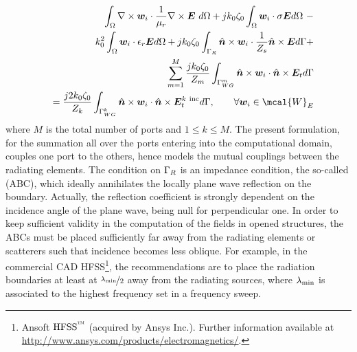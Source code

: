 \begin{eqnarray}
\label{eq:FEMformTFE}
& & \hspace{-1.5cm} \int_\mrm{\Omega} \nabla \times \mbfit{w}_i \cdot \frac{1}{\mu_r} \nabla \times \mbfit{E} \ d\mrm{\Omega} + j k_0 \zeta_0 \int_\mrm{\Omega} \mbfit{w}_i \cdot \sigma \mbfit{E} d\mrm{\Omega} \ - \nonumber \\
& &\hspace{-1cm} k_0^2 \int_\mrm{\Omega} \mbfit{w}_i \cdot \epsilon_r \mbfit{E} d\mrm{\Omega} + j k_0 \zeta_0 \int_{\mrm{\Gamma}_R} \hat{\mbfit{n}} \times \mbfit{w}_i \cdot \frac{1}{Z_s} \hat{\mbfit{n}} \times \mbfit{E} d\mrm{\Gamma} + \nonumber \\
& & \hspace{-.5cm}\sum_{m=1}^M \frac{j k_0 \zeta_0}{Z_m} \int_{\mrm{\Gamma}_{WG}^m} \hat{\mbfit{n}} \times \mbfit{w}_i \cdot \hat{\mbfit{n}} \times \mbfit{E}_t d\mrm{\Gamma} \nonumber \\
& & \hspace{0cm} = \frac{j 2 k_0 \zeta_0}{Z_k} \int_{\mrm{\Gamma}_{WG}^k} \hat{\mbfit{n}} \times \mbfit{w}_i \cdot \hat{\mbfit{n}} \times \mbfit{E}_t^{k \ \mrm{inc}}  d\mrm{\Gamma}, \qquad \forall \mbfit{w}_i \in \mcal{W}_E
\end{eqnarray} where $M$ is the total number of ports and $1 \leq k \leq M$. The present formulation, for the summation all over the ports entering into the computational domain, couples one port to the others, hence models the mutual couplings between the radiating elements.
The condition on $\mathrm{\Gamma}_R$ is an impedance condition, the so-called  (ABC), which ideally annihilates the locally plane wave reflection on the boundary. Actually, the reflection coefficient is strongly dependent on the incidence angle of the plane wave, being null for perpendicular one. In order to keep sufficient validity in the computation of the fields in opened structures, the ABCs must be placed sufficiently far away from the radiating elements or scatterers such that incidence becomes less oblique. For example, in the commercial CAD HFSS\footnote{Ansoft $\mrm{HFSS}^{\textrm{\texttrademark}}$ (acquired by Ansys Inc.). Further information available at \url{http://www.ansys.com/products/electromagnetics/}.}, the recommendations are to place the radiation boundaries at least at $\nicefrac{\lambda_{\mathrm{min}}}{2}$ away from the radiating sources, where $\lambda_{\mathrm{min}}$ is associated to the highest frequency set in a frequency sweep.

